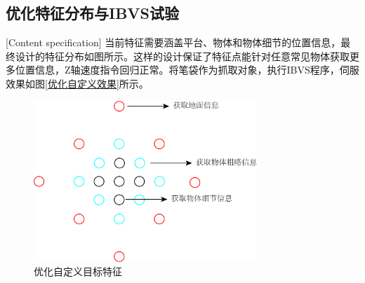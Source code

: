 \documentclass[fontset=fandol,type=bachelor,campus=harbin,bsmainpagenumberline=true]{hithesisbook}
\begin{document}
\subsection{优化特征分布与IBVS试验}[Content specification]
当前特征需要涵盖平台、物体和物体细节的位置信息，最终设计的特征分布如图\label{优化自定义目标特征}所示。这样的设计保证了特征点能针对任意常见物体获取更多位置信息，Z轴速度指令回归正常。将笔袋作为抓取对象，执行IBVS程序，伺服效果如图\ref{优化自定义效果}所示。
\begin{figure}[h]
	\centering
	\includegraphics[width=0.75\textwidth]{chapter4/优化自定义目标特征}
	\caption{优化自定义目标特征}
	\label{优化自定义目标特征}
\end{figure}
\end{document}
